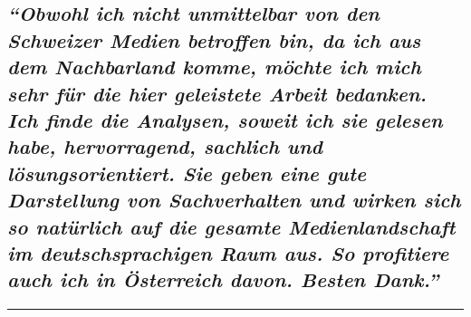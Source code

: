 \hypertarget{obwohl-ich-nicht-unmittelbar-von-den-schweizer-medien-betroffen-bin-da-ich-aus-dem-nachbarland-komme-muxf6chte-ich-mich-sehr-fuxfcr-die-hier-geleistete-arbeit-bedanken-ich-finde-die-analysen-soweit-ich-sie-gelesen-habe-hervorragend-sachlich-und-luxf6sungsorientiert-sie-geben-eine-gute-darstellung-von-sachverhalten-und-wirken-sich-so-natuxfcrlich-auf-die-gesamte-medienlandschaft-im-deutschsprachigen-raum-aus-so-profitiere-auch-ich-in-uxf6sterreich-davon-besten-dank}{%
\subsection{\texorpdfstring{\emph{``Obwohl ich nicht unmittelbar von den
Schweizer Medien betroffen bin, da ich aus dem Nachbarland komme, möchte
ich mich sehr für die hier geleistete Arbeit bedanken. Ich finde die
Analysen, soweit ich sie gelesen habe, hervorragend, sachlich und
lösungsorientiert. Sie geben eine gute Darstellung von Sachverhalten und
wirken sich so natürlich auf die gesamte Medienlandschaft im
deutschsprachigen Raum aus. So profitiere auch ich in Österreich davon.
Besten
Dank.''}}{``Obwohl ich nicht unmittelbar von den Schweizer Medien betroffen bin, da ich aus dem Nachbarland komme, möchte ich mich sehr für die hier geleistete Arbeit bedanken. Ich finde die Analysen, soweit ich sie gelesen habe, hervorragend, sachlich und lösungsorientiert. Sie geben eine gute Darstellung von Sachverhalten und wirken sich so natürlich auf die gesamte Medienlandschaft im deutschsprachigen Raum aus. So profitiere auch ich in Österreich davon. Besten Dank.''}}\label{obwohl-ich-nicht-unmittelbar-von-den-schweizer-medien-betroffen-bin-da-ich-aus-dem-nachbarland-komme-muxf6chte-ich-mich-sehr-fuxfcr-die-hier-geleistete-arbeit-bedanken-ich-finde-die-analysen-soweit-ich-sie-gelesen-habe-hervorragend-sachlich-und-luxf6sungsorientiert-sie-geben-eine-gute-darstellung-von-sachverhalten-und-wirken-sich-so-natuxfcrlich-auf-die-gesamte-medienlandschaft-im-deutschsprachigen-raum-aus-so-profitiere-auch-ich-in-uxf6sterreich-davon-besten-dank}}

\begin{center}\rule{0.5\linewidth}{\linethickness}\end{center}

